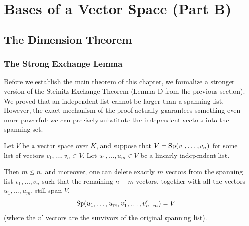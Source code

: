 \renewcommand{\thetheorem}{11.b.\arabic{theorem}}
\setcounter{theorem}{0}
\setcounter{chapter}{10}

\chapter{Bases of a Vector Space (Part B)}

\setcounter{section}{1}
\section{The Dimension Theorem}

\subsection{The Strong Exchange Lemma}

Before we establish the main theorem of this chapter, we formalize a stronger version of the Steinitz Exchange Theorem (Lemma D from the previous section). We proved that an independent list cannot be larger than a spanning list. However, the exact mechanism of the proof actually guarantees something even more powerful: we can precisely substitute the independent vectors into the spanning set.

\begin{lemma}
\label{lem:strong_steinitz}
Let $V$ be a vector space over $K$, and suppose that $V = \operatorname{Sp}(v_1, \dots, v_n)$ for some list of vectors $v_1, \dots, v_n \in V$. Let $u_1, \dots, u_m \in V$ be a linearly independent list. 

Then $m \le n$, and moreover, one can delete exactly $m$ vectors from the spanning list $v_1, \dots, v_n$ such that the remaining $n-m$ vectors, together with all the vectors $u_1, \dots, u_m$, still span $V$.
\[
\operatorname{Sp}(u_1, \dots, u_m, v'_1, \dots, v'_{n-m}) = V
\]
(where the $v'$ vectors are the survivors of the original spanning list).
\end{lemma}

